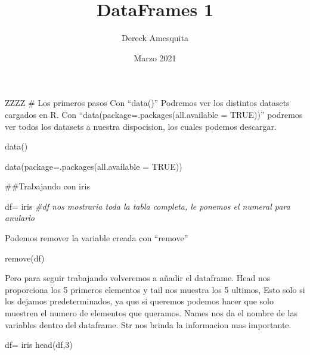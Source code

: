 \documentclass[
]{article}
\title{DataFrames 1}
\author{Dereck Amesquita}
\date{Marzo 2021}
\newenvironment{Shaded}{\begin{snugshade}}{\end{snugshade}}
\newcommand{\AttributeTok}[1]{\textcolor[rgb]{0.77,0.63,0.00}{#1}}
\newcommand{\CommentTok}[1]{\textcolor[rgb]{0.56,0.35,0.01}{\textit{#1}}}
\newcommand{\ConstantTok}[1]{\textcolor[rgb]{0.00,0.00,0.00}{#1}}
\newcommand{\DecValTok}[1]{\textcolor[rgb]{0.00,0.00,0.81}{#1}}
\newcommand{\FunctionTok}[1]{\textcolor[rgb]{0.00,0.00,0.00}{#1}}
\newcommand{\NormalTok}[1]{#1}
\newcommand{\OtherTok}[1]{\textcolor[rgb]{0.56,0.35,0.01}{#1}}
\begin{document}
\maketitle

ZZZZ \# Los primeros pasos Con ``data()'' Podremos ver los distintos
datasets cargados en R. Con ``data(package=.packages(all.available =
TRUE))'' podremos ver todos los datasets a nuestra dispocision, los
cuales podemos descargar.

\begin{Shaded}
\begin{Highlighting}[]
\FunctionTok{data}\NormalTok{() }

\FunctionTok{data}\NormalTok{(}\AttributeTok{package=}\FunctionTok{.packages}\NormalTok{(}\AttributeTok{all.available =} \ConstantTok{TRUE}\NormalTok{))}
\end{Highlighting}
\end{Shaded}

\#\#Trabajando con iris

\begin{Shaded}
\begin{Highlighting}[]
\NormalTok{df}\OtherTok{=}\NormalTok{ iris}
\CommentTok{\#df nos mostraria toda la tabla completa, le ponemos el numeral para anularlo}
\end{Highlighting}
\end{Shaded}

Podemos remover la variable creada con ``remove''

\begin{Shaded}
\begin{Highlighting}[]
\FunctionTok{remove}\NormalTok{(df)}
\end{Highlighting}
\end{Shaded}

Pero para seguir trabajando volveremos a añadir el dataframe. Head nos
proporciona los 5 primeros elementos y tail nos muestra los 5 ultimos,
Esto solo si los dejamos predeterminados, ya que si queremos podemos
hacer que solo muestren el numero de elementos que queramos. Names nos
da el nombre de las variables dentro del dataframe. Str nos brinda la
informacion mas importante.

\begin{Shaded}
\begin{Highlighting}[]
\NormalTok{df}\OtherTok{=}\NormalTok{ iris}
\FunctionTok{head}\NormalTok{(df,}\DecValTok{3}\NormalTok{)}
\end{Highlighting}
\end{Shaded}
\end{document}
